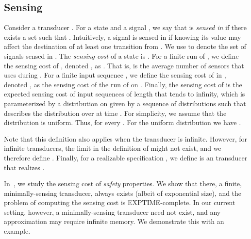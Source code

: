 \documentclass[runningheads,a4paper]{llncs}
\begin{document}
\subsection{Sensing}
\label{sec:sensing}
Consider a transducer  . For a state  and a signal , we say that  is {\em sensed in\/}  if there exists a set  such that . Intuitively, a signal is sensed in  if knowing its value may affect the destination of at least one transition from . We use  to denote the set of signals sensed in . 
The {\em sensing cost\/} of a state  is . 
For a finite run  of , we define the sensing cost of , denoted , as . That is,  is the average number of sensors that  uses during . For a finite input sequence , we define the sensing cost of  in , denoted , as the sensing cost of the run of  on . 
Finally, the sensing cost of  is the expected sensing cost of input sequences of length that tends to infinity, which is parameterized by a distribution 
on  given by a sequence of distributions  such that  describes the distribution over  at time . For simplicity, we assume that the distribution is uniform. Thus,  for every . 
For the uniform distribution we have . 

Note that this definition also applies when the transducer is infinite. However, for infinite transducers, the limit in the definition of  might not exist, and we therefore define . Finally, for a realizable specification , we define  is an  transducer that realizes .

In~\cite{AKK15}, we study the sensing cost of {\em safety} properties. 
We show that there, a finite, minimally-sensing transducer, always exists (albeit of exponential size), and the problem of computing the sensing cost is EXPTIME-complete. In our current setting, however, a minimally-sensing transducer need not exist, and 
any approximation may require infinite memory. 
We demonstrate this with an example. 
\end{document}
